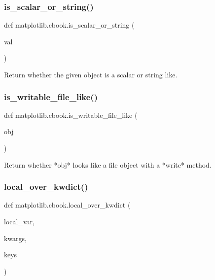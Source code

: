 \subsubsection{\texorpdfstring{is\+\_\+scalar\+\_\+or\+\_\+string()}{is\_scalar\_or\_string()}}
{\footnotesize\ttfamily def matplotlib.\+cbook.\+is\+\_\+scalar\+\_\+or\+\_\+string (\begin{DoxyParamCaption}\item[{}]{val }\end{DoxyParamCaption})}

\begin{DoxyVerb}Return whether the given object is a scalar or string like.\end{DoxyVerb}
 \mbox{\label{namespacematplotlib_1_1cbook_a3f29aa0083b035701005f2ab74cd563d}} 
\subsubsection{\texorpdfstring{is\+\_\+writable\+\_\+file\+\_\+like()}{is\_writable\_file\_like()}}
{\footnotesize\ttfamily def matplotlib.\+cbook.\+is\+\_\+writable\+\_\+file\+\_\+like (\begin{DoxyParamCaption}\item[{}]{obj }\end{DoxyParamCaption})}

\begin{DoxyVerb}Return whether *obj* looks like a file object with a *write* method.\end{DoxyVerb}
 \mbox{\label{namespacematplotlib_1_1cbook_a293736790dc272651ffe29d54d8c877e}} 
\subsubsection{\texorpdfstring{local\+\_\+over\+\_\+kwdict()}{local\_over\_kwdict()}}
{\footnotesize\ttfamily def matplotlib.\+cbook.\+local\+\_\+over\+\_\+kwdict (\begin{DoxyParamCaption}\item[{}]{local\+\_\+var,  }\item[{}]{kwargs,  }\item[{}]{keys }\end{DoxyParamCaption})}

